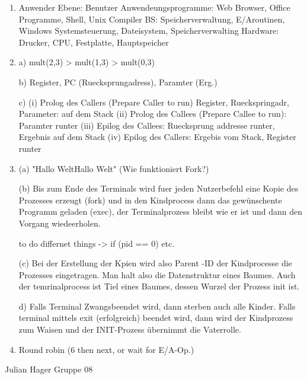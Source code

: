 \begin{enumerate}[label={T\arabic*},start=6]
	\item 
		Anwender Ebene:			Benutzer
		Anwendeungsprogramme: 	Web Browser, Office Programme, Shell, Unix Compiler
		BS: 					Speicherverwaltung, E/Aroutinen, Windows Systemsteuerung, Dateisystem, Speicherverwalting
		Hardware: 				Drucker, CPU, Festplatte, Hauptspeicher
	\item 
		a) mult(2,3) > mult(1,3) > mult(0,3)

		b) Register, PC (Ruecksprungadress), Paramter (Erg.)

		c) 	(i) Prolog des Callers (Prepare Caller to run) Register, Rueckspringadr, Parameter: auf dem Stack
		   (ii) Prolog des Callees (Prepare Callee to run): Paramter runter
		  (iii) Epilog des Callees: Ruecksprung addresse runter, Ergebnis auf dem Stack
		   (iv) Epilog des Callers: Ergebis vom Stack, Register runter 
	\item (a) "Hallo Welt\n Hallo Welt"
	(Wie funktioniert Fork?)

		   (b) Bis zum Ende des Terminals wird fuer jeden Nutzerbefehl eine Kopie des Prozesses erzeugt (fork) und in den Kindprocess dann das gewünschente Programm geladen (exec), der Terminalprozess bleibt wie er ist und dann den Vorgang wiedeerholen.

		   to do differnet things -> if (pid == 0) etc.

		   (c) Bei der Erstellung der Kpien wird also Parent -ID der Kindprocesse die Prozesses eingetragen. Man halt also die Datenstruktur eines Baumes. Auch der temrinalprocess ist Tiel eines Baumes, dessen Wurzel der Prozess init ist. 

		   d) Falls Terminal Zwangsbeendet wird, dann sterben auch alle Kinder. Falls terminal mittels exit (erfolgreich) beendet wird, dann wird der Kindprozess zum Waisen und der INIT-Prozess übernimmt die Vaterrolle.
	\item Round robin (6 then next, or wait for E/A-Op.)

	

\end{enumerate}

Julian Hager
Gruppe 08